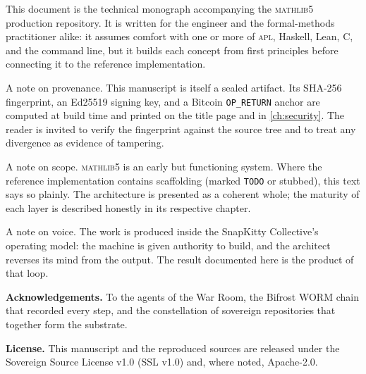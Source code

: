 This document is the technical monograph accompanying the \textsc{mathlib5}
production repository. It is written for the engineer and the formal-methods
practitioner alike: it assumes comfort with one or more of \textsc{apl},
Haskell, Lean, C, and the command line, but it builds each concept from
first principles before connecting it to the reference implementation.

A note on provenance. This manuscript is itself a sealed artifact. Its
SHA-256 fingerprint, an Ed25519 signing key, and a Bitcoin \texttt{OP\_RETURN}
anchor are computed at build time and printed on the title page and in
\cref{ch:security}. The reader is invited to verify the fingerprint against
the source tree and to treat any divergence as evidence of tampering.

A note on scope. \textsc{mathlib5} is an early but functioning system. Where
the reference implementation contains scaffolding (marked \texttt{TODO} or
stubbed), this text says so plainly. The architecture is presented as a
coherent whole; the maturity of each layer is described honestly in its
respective chapter.

A note on voice. The work is produced inside the SnapKitty Collective's
operating model: the machine is given authority to build, and the architect
reverses its mind from the output. The result documented here is the product
of that loop.

\vspace{0.2in}
\noindent\textbf{Acknowledgements.} To the agents of the War Room, the
Bifrost WORM chain that recorded every step, and the constellation of
sovereign repositories that together form the substrate.

\vspace{0.1in}
\noindent\textbf{License.} This manuscript and the reproduced sources are
released under the Sovereign Source License v1.0 (SSL v1.0) and, where noted,
Apache-2.0.
